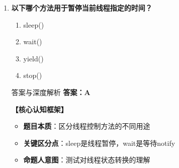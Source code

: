 \documentclass[12pt, a4paper]{ctexart}
\begin{document}
\begin{enumerate}[label=\textbf{\arabic*.}]
\begin{bluebox}{答案与深度解析}
\begin{itemize}[label={}, leftmargin=*, nosep]
		      \item \textbf{D. threadName() — 错误（不存在）}
		      \begin{itemize}[label={}, leftmargin=*, nosep]
			      \item \textbf{辨析}：常见干扰项
		      \end{itemize}

		      \end{itemize}

		      \textbf{【应背诵知识点（命题人思维版）】}
		      \begin{enumerate}[label={}, leftmargin=*, nosep]
			      \item \textbf{Thread常用API}：
			            \begin{itemize}[label={}, nosep]
				            \item currentThread()：返回当前线程
				            \item getName()：获取线程名
				            \item setName(String name)：设置线程名
				            \item getId()：获取线程ID
				            \item getPriority()：获取优先级
			            \end{itemize}
		      \end{enumerate}

		      \textbf{【命题趋势与实战策略】}

		      \textbf{考场秒杀技巧}：Thread.currentThread().getName()是标准写法
	      \end{bluebox}

	\item \textbf{以下哪个方法用于暂停当前线程指定的时间？}
	      \begin{enumerate}[label=\Alph*.]
		      \item sleep()
		      \item wait()
		      \item yield()
		      \item stop()
	      \end{enumerate}

	      \begin{bluebox}{答案与深度解析}
		      \textbf{答案：A}

		      \textbf{【核心认知框架】}
		      \begin{itemize}[label={}, leftmargin=*, nosep]
			      \item \textbf{题目本质}：区分线程控制方法的不同用途
			      \item \textbf{关键区分点}：sleep是线程暂停，wait是等待notify
			      \item \textbf{命题人意图}：测试对线程状态转换的理解
		      \end{itemize}


\end{bluebox}
\end{enumerate}
\end{document}
